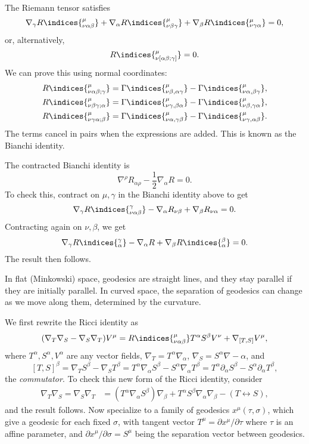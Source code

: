 \documentclass[12pt]{article}
\begin{document}
The Riemann tensor satisfies
\[
\nabla_\gamma R\indices{^{\mu}_{\nu\alpha\beta}} + \nabla_\alpha R\indices{^{\mu}_{\nu\beta\gamma}} + \nabla_\beta R\indices{^{\mu}_{\nu\gamma\alpha}} = 0,
\]
or, alternatively,
\[
	R\indices{^{\mu}_{\nu[\alpha\beta;\gamma]}} = 0.
\]
We can prove this using normal coordinates:
\begin{align*}
	R\indices{^{\mu}_{\nu\alpha\beta;\gamma}} &= \Gamma\indices{^{\mu}_{\nu\beta,\alpha\gamma}} - \Gamma\indices{^{\mu}_{\nu\alpha,\beta\gamma}}, \\
	R\indices{^{\mu}_{\nu\beta\gamma;\alpha}} &= \Gamma\indices{^{\mu}_{\nu\gamma,\beta\alpha}} - \Gamma\indices{^{\mu}_{\nu\beta,\gamma\alpha}}, \\
	R\indices{^{\mu}_{\nu\gamma\alpha;\beta}} &= \Gamma\indices{^{\mu}_{\nu\alpha,\gamma\beta}} - \Gamma\indices{^{\mu}_{\nu\gamma,\alpha\beta}}.
\end{align*}
The terms cancel in pairs when the expressions are added. This is known as the Bianchi identity.


The contracted Bianchi identity is
\[
\nabla^\rho R_{\alpha \rho} - \frac{1}{2} \nabla_\alpha R = 0.
\]
To check this, contract on $\mu, \gamma$ in the Bianchi identity above to get
\[
\nabla_\gamma R\indices{^{\gamma}_{\nu\alpha\beta}} - \nabla_\alpha R_{\nu\beta} + \nabla_\beta R_{\nu\alpha} = 0.
\]
Contracting again on $\nu, \beta$, we get
\[
\nabla_\gamma R\indices{^{\gamma}_{\alpha}} - \nabla_\alpha R + \nabla_\beta R\indices{^{\beta}_{\alpha}} = 0.
\]
The result then follows.

In flat (Minkowski) space, geodesics are straight lines, and they stay parallel if they are initially parallel. In curved space, the separation of geodesics can change as we move along them, determined by the curvature.

We first rewrite the Ricci identity as
\[
	(\nabla_T \nabla_S - \nabla_S \nabla_T) V^\mu = R\indices{^{\mu}_{\nu\alpha\beta}} T^\alpha S^\beta V^\nu + \nabla_{[T, S]} V^\mu,
\]
where $T^\alpha, S^\alpha, V^\alpha$ are any vector fields, $\nabla_T = T^\alpha \nabla_\alpha$, $\nabla_S = S^\alpha \nabla-\alpha$, and
\[
	[T, S]^\beta = \nabla_T S^\beta - \nabla_S T^\beta = T^\alpha \nabla_\alpha S^\beta - S^\alpha \nabla_\alpha T^\beta = T^\alpha \partial_\alpha S^\beta - S^\alpha \partial_\alpha T^\beta,
\]
the \emph{commutator}. To check this new form of the Ricci identity, consider
\begin{align*}
	\nabla_T \nabla_S = \nabla_S \nabla_T &= (T^\alpha \nabla_\alpha S^\beta)\nabla_\beta + T^\alpha S^\beta \nabla_\alpha \nabla_\beta - (T \leftrightarrow S),
\end{align*}
and the result follows. Now specialize to a family of geodesics $x^\mu(\tau, \sigma)$, which give a geodesic for each fixed $\sigma$, with tangent vector $T^\mu = \partial x^\mu / \partial \tau$ where $\tau$ is an affine parameter, and $\partial x^\mu /\partial \sigma = S^\mu$ being the separation vector between geodesics.
\end{document}
